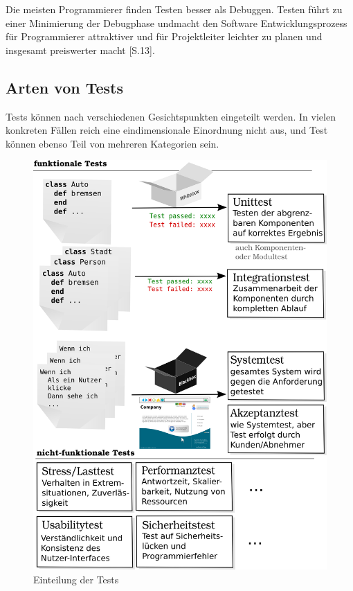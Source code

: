 Die meisten Programmierer finden Testen besser als Debuggen. Testen führt zu einer Minimierung der Debugphase undmacht den Software Entwicklungsprozess für Programmierer attraktiver und für Projektleiter leichter zu planen \citep{orsini_rails_2007} und insgesamt preiswerter macht \citep{liggesmeyer_modultest_1990}[S.13].


\subsection{Arten von Tests}
Tests können nach verschiedenen Gesichtspunkten eingeteilt werden. In vielen konkreten Fällen reich eine eindimensionale Einordnung nicht aus, und Test können ebenso Teil von mehreren Kategorien sein.
\begin{figure}[hp]
 \centering
 \includegraphics[width=\textwidth]{./diagrams/testarten.png}
 \caption{Einteilung der Tests}
 \label{fig:testArten}
\end{figure}

